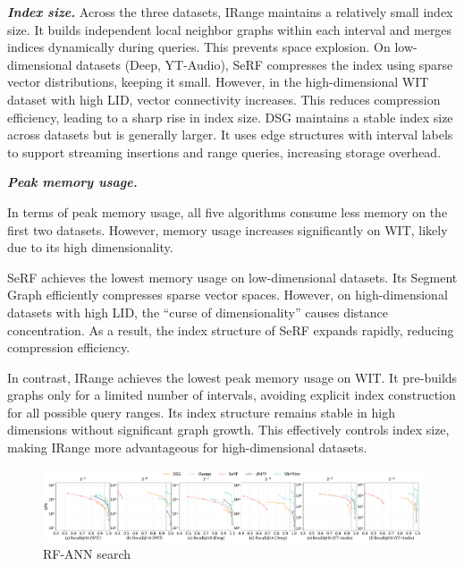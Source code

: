 \documentclass[sigconf, nonacm]{acmart}
\begin{document}
\begin{sloppypar}
\vspace{0.5em}




\textit{\textbf{Index size.}} Across the three datasets, IRange maintains a relatively small index size. It builds independent local neighbor graphs within each interval and merges indices dynamically during queries. This prevents space explosion. On low-dimensional datasets (Deep, YT-Audio), SeRF compresses the index using sparse vector distributions, keeping it small. However, in the high-dimensional WIT dataset with high LID, vector connectivity increases. This reduces compression efficiency, leading to a sharp rise in index size. DSG maintains a stable index size across datasets but is generally larger. It uses edge structures with interval labels to support streaming insertions and range queries, increasing storage overhead.
\vspace{0.5em}

\textit{\textbf{Peak memory usage.}}

In terms of peak memory usage, all five algorithms consume less memory on the first two datasets. However, memory usage increases significantly on WIT, likely due to its high dimensionality.

SeRF achieves the lowest memory usage on low-dimensional datasets. Its Segment Graph efficiently compresses sparse vector spaces. However, on high-dimensional datasets with high LID, the “curse of dimensionality” causes distance concentration. As a result, the index structure of SeRF expands rapidly, reducing compression efficiency.

In contrast, IRange achieves the lowest peak memory usage on WIT. It pre-builds graphs only for a limited number of intervals, avoiding explicit index construction for all possible query ranges. Its index structure remains stable in high dimensions without significant graph growth. This effectively controls index size, making IRange more advantageous for high-dimensional datasets.
\vspace{0.5em}



\begin{figure}[htbp]
  \centering
  \setlength{\abovecaptionskip}{0cm}
    \setlength{\belowcaptionskip}{-0.4cm}
  \includegraphics[width=\textwidth]{figures/exp/exp_8_2.pdf}
  \caption{RF-ANN search }
  \label{fig:exp_8_2}
\end{figure}

\end{sloppypar}
\end{document}
